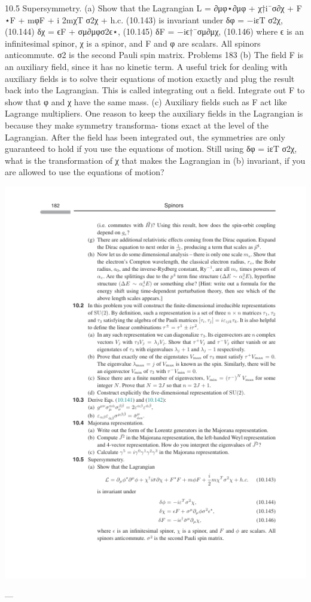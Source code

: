 10.5 Supersymmetry.
(a) Show that the Lagrangian
L = ∂μφ⋆∂μφ + χ†i¯σ∂χ + F ⋆F + mφF + i
2mχT σ2χ + h.c.
(10.143)
is invariant under
δφ = −iεT σ2χ,
(10.144)
δχ = ϵF + σμ∂μφσ2ϵ⋆,
(10.145)
δF = −iϵ†¯σμ∂μχ,
(10.146)
where ϵ is an inﬁnitesimal spinor, χ is a spinor, and F and φ are scalars. All
spinors anticommute. σ2 is the second Pauli spin matrix.
Problems
183
(b) The ﬁeld F is an auxiliary ﬁeld, since it has no kinetic term. A useful trick for
dealing with auxiliary ﬁelds is to solve their equations of motion exactly and
plug the result back into the Lagrangian. This is called integrating out a ﬁeld.
Integrate out F to show that φ and χ have the same mass.
(c) Auxiliary ﬁelds such as F act like Lagrange multipliers. One reason to keep the
auxiliary ﬁelds in the Lagrangian is because they make symmetry transforma-
tions exact at the level of the Lagrangian. After the ﬁeld has been integrated
out, the symmetries are only guaranteed to hold if you use the equations of
motion. Still using δφ = iεT σ2χ, what is the transformation of χ that makes the
Lagrangian in (b) invariant, if you are allowed to use the equations of motion?

\includegraphics{./figs/10_Spinors_page_202.png}

---

